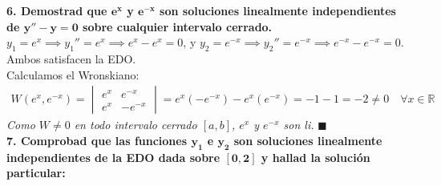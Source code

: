 \documentclass[11pt, a4paper]{article}
\begin{document}
\noindent\textbf{6. Demostrad que $\bm{e^x}$ y $\bm{e^{-x}}$ son soluciones linealmente independientes de $\bm{y''-y=0}$ sobre cualquier intervalo cerrado.} \\
$y_1 = e^x \implies y_1'' = e^x \implies e^x - e^x = 0$, y $y_2 = e^{-x} \implies y_2'' = e^{-x} \implies e^{-x} - e^{-x} = 0$. Ambos satisfacen la EDO. \\
Calculamos el Wronskiano:
\begin{align*}
W(e^x, e^{-x}) = \begin{vmatrix} e^x & e^{-x} \\ e^x & -e^{-x} \end{vmatrix} = e^x(-e^{-x}) - e^x(e^{-x}) = -1 - 1 = -2 \neq 0 \quad \forall x \in \mathbb{R}
\end{align*}
\textit{Como $W \neq 0$ en todo intervalo cerrado $[a,b]$, $e^x$ y $e^{-x}$ son li.} \quad $\blacksquare$\\


\noindent\textbf{7. Comprobad que las funciones $\bm{y_1}$ e $\bm{y_2}$ son soluciones linealmente independientes de la EDO dada sobre $\bm{[0,2]}$ y hallad la solución particular:}
\end{document}
